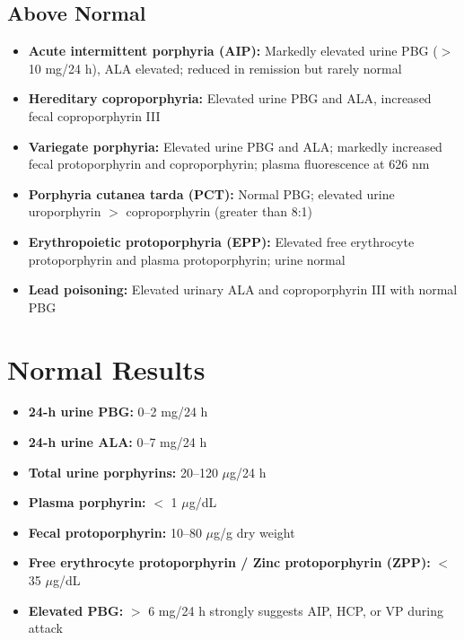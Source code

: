 \subsection*{Above Normal}
\begin{itemize}
  \item \textbf{Acute intermittent porphyria (AIP):} Markedly elevated urine PBG ($>$ 10 mg/24 h), ALA elevated; reduced in remission but rarely normal
  \item \textbf{Hereditary coproporphyria:} Elevated urine PBG and ALA, increased fecal coproporphyrin III
  \item \textbf{Variegate porphyria:} Elevated urine PBG and ALA; markedly increased fecal protoporphyrin and coproporphyrin; plasma fluorescence at 626 nm
  \item \textbf{Porphyria cutanea tarda (PCT):} Normal PBG; elevated urine uroporphyrin $>$ coproporphyrin (greater than 8:1)
  \item \textbf{Erythropoietic protoporphyria (EPP):} Elevated free erythrocyte protoporphyrin and plasma protoporphyrin; urine normal
  \item \textbf{Lead poisoning:} Elevated urinary ALA and coproporphyrin III with normal PBG
\end{itemize}

\section*{Normal Results}
\begin{itemize}
  \item \textbf{24-h urine PBG:} 0--2 mg/24 h
  \item \textbf{24-h urine ALA:} 0--7 mg/24 h
  \item \textbf{Total urine porphyrins:} 20--120 $\mu$g/24 h
  \item \textbf{Plasma porphyrin:} $<$ 1 $\mu$g/dL
  \item \textbf{Fecal protoporphyrin:} 10--80 $\mu$g/g dry weight
  \item \textbf{Free erythrocyte protoporphyrin / Zinc protoporphyrin (ZPP):} $<$ 35 $\mu$g/dL
  \item \textbf{Elevated PBG:} $>$ 6 mg/24 h strongly suggests AIP, HCP, or VP during attack
\end{itemize}

